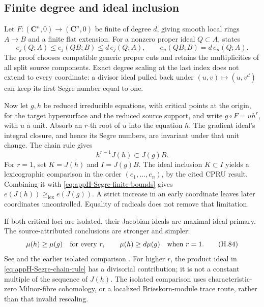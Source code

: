 \subsection{Finite degree and ideal inclusion}
\label{sec:appH-Segre-finite-degree}

Let $F:(\mathbf C^n,0)\to(\mathbf C^n,0)$ be finite of degree
$d$, giving smooth local rings $A\to B$ and a finite flat
extension. For a nonzero proper ideal $Q\subset A$,
\cite[Theorem~3.4]{JelonekPerezSantos26SegreV1} states
\[
 e_j(Q;A)\leq e_j(QB;B)\leq d\,e_j(Q;A),
 \qquad e_n(QB;B)=d\,e_n(Q;A).
\tag{H.82}\label{eq:appH-Segre-finite-bounds}
\]
The proof chooses compatible generic proper cuts and retains
the multiplicities of all split source components. Exact
degree scaling at the last index does not extend to every
coordinate: a divisor ideal pulled back under
$(u,v)\mapsto(u,v^d)$ can keep its first Segre number equal to one.

Now let $g,h$ be reduced irreducible equations, with critical
points at the origin, for the target hypersurface and the
reduced source support, and write
$g\circ F=u h^r$, with $u$ a unit. Absorb an $r$-th root of
$u$ into the equation $h$. The gradient ideal's integral
closure, and hence its Segre numbers, are invariant under
that unit change. The chain rule gives
\[
 h^{r-1}J(h)\subset J(g)B.
\tag{H.83}\label{eq:appH-Segre-chain-rule}
\]
For $r=1$, set $K=J(h)$ and $I=J(g)B$.
The ideal inclusion $K\subset I$ yields a lexicographic
comparison in the order $(e_1,\ldots,e_n)$, by the cited
CPRU result. Combining it with
\eqref{eq:appH-Segre-finite-bounds} gives
$e(J(h))\geq_{\mathrm{lex}}e(J(g))$.
A strict increase in an early coordinate leaves later
coordinates uncontrolled. Equality of radicals does not
remove that limitation.

If both critical loci are isolated, their Jacobian ideals
are maximal-ideal-primary. The source-attributed conclusions
are stronger and simpler:
\[
 \mu(h)\geq\mu(g)\quad\hbox{for every }r,
 \qquad \mu(h)\geq d\mu(g)\quad\hbox{when }r=1.
\tag{H.84}\label{eq:appH-Segre-isolated-Milnor}
\]
See \cite[Theorem~4.2, Corollary~4.3]{JelonekPerezSantos26SegreV1}
and the earlier isolated comparison \cite{Jelonek23MilnorV1}.
For higher $r$, the product ideal in
\eqref{eq:appH-Segre-chain-rule} has a divisorial contribution;
it is not a constant multiple of the sequence of $J(h)$.
The isolated comparison uses characteristic-zero Milnor-fibre
cohomology, or a localized Brieskorn-module trace route, rather
than that invalid rescaling.

